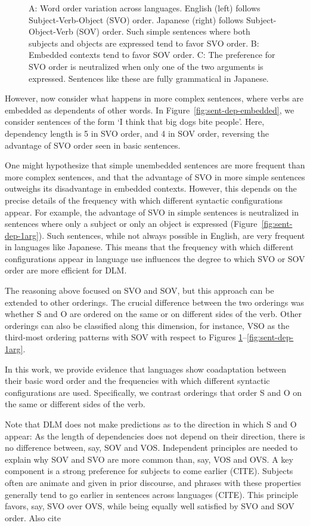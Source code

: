 \documentclass[11pt,a4paper]{article}
\begin{document}
\begin{figure}
        \caption{A: Word order variation across languages. English (left) follows Subject-Verb-Object (SVO) order. Japanese (right) follows Subject-Object-Verb (SOV) order. Such simple sentences where both subjects and objects are expressed tend to favor SVO order. B: Embedded contexts tend to favor SOV order. C: The preference for SVO order is neutralized when only one of the two arguments is expressed. Sentences like these are fully grammatical in Japanese.}
        \label{fig:sent-dep}
\end{figure}

However, now consider what happens in more complex sentences, where verbs are embedded as dependents of other words.
In Figure~\ref{fig:sent-dep-embedded}, we consider sentences of the form `I think that big dogs bite people'.
Here, dependency length is 5 in SVO order, and 4 in SOV order, reversing the advantage  of SVO order seen in basic sentences.

One might hypothesize that simple unembedded sentences are more frequent than more complex sentences, and that the advantage of SVO in more simple sentences outweighs its disadvantage in embedded contexts.
However, this depends on the precise details of the frequency with which different syntactic configurations appear.
For example, the advantage of SVO in simple sentences is neutralized in sentences where only a subject or only an object is expressed (Figure~\ref{fig:sent-dep-1arg}).
Such sentences, while not always possible in English, are very frequent in languages like Japanese.
This means that the frequency with which different configurations appear in language use influences the degree to which SVO or SOV order are more efficient for DLM.



The reasoning above focused on SVO and SOV, but this approach can be extended to other orderings.
The crucial difference between the two orderings was whether S and O are ordered on the same or on different sides of the verb.
Other orderings can also be classified along this dimension, for instance, VSO as the third-most ordering patterns with SOV with respect to Figures \ref{fig:sent-dep}--\ref{fig:sent-dep-1arg}.

In this work, we provide evidence that languages show coadaptation between their basic word order and the frequencies with which different syntactic configurations are used.
Specifically, we contrast orderings that order S and O on the same or different sides of the verb.

Note that DLM does not make predictions as to the direction in which S and O appear: As the length of dependencies does not depend on their direction, there is no difference between, say, SOV and VOS.
Independent principles are needed to explain why SOV and SVO are more common than, say, VOS and OVS.
A key component is a strong preference for subjects to come earlier (CITE).
Subjects often are animate and given in prior discourse, and phrases with these properties generally tend to go earlier in sentences across languages (CITE).
This principle favors, say, SVO over OVS, while being equally well satisfied by SVO and SOV order.
Also cite \cite{kemmerer2012cross-linguistic}
\end{document}
